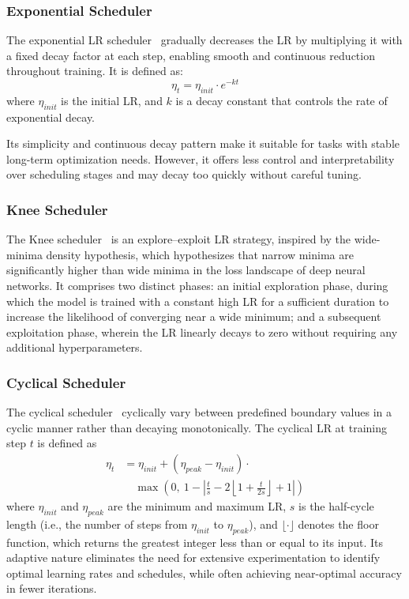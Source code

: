 \subsubsection{Exponential Scheduler}

The exponential LR scheduler~\cite{li2019exponential} gradually decreases the LR by multiplying it with a fixed decay factor at each step, enabling smooth and continuous reduction throughout training. It is defined as:
\[
\eta_t =  \eta_{init} \cdot e^{-kt}
\]
where \(\eta_{init}\) is the initial LR, and \(k\) is a decay constant that controls the rate of exponential decay.

Its simplicity and continuous decay pattern make it suitable for tasks with stable long-term optimization needs. However, it offers less control and interpretability over scheduling stages and may decay too quickly without careful tuning.

\subsubsection{Knee Scheduler}

The Knee scheduler~\cite{iyer2023wide} is an explore–exploit LR strategy, inspired by the wide-minima density hypothesis, which hypothesizes that narrow minima are significantly higher than wide minima in the loss landscape of deep neural networks.  It comprises two distinct phases: an initial exploration phase, during which the model is trained with a constant high LR for a sufficient duration to increase the likelihood of converging near a wide minimum; and a subsequent exploitation phase, wherein the LR linearly decays to zero without requiring any additional hyperparameters.


\subsubsection{Cyclical Scheduler}

The cyclical scheduler~\cite{smith2017cyclical} cyclically vary between predefined boundary values in a cyclic manner rather than decaying monotonically. The cyclical LR at training step \( t \) is defined as
\begin{align}
\eta_t &= \eta_{init} + (\eta_{peak} - \eta_{init}) \cdot \nonumber \\
&\quad \max\left(0,\ 1 - \left| \frac{t}{s} - 2 \left\lfloor 1 + \frac{t}{2s} \right\rfloor + 1 \right| \right)
\end{align}
where \( \eta_{init} \) and \( \eta_{peak} \) are the minimum and maximum LR, \( s \) is the half-cycle length (i.e., the number of steps from \( \eta_{init} \) to \( \eta_{peak} \)), and \( \lfloor \cdot \rfloor \) denotes the floor function, which returns the greatest integer less than or equal to its input. Its adaptive nature eliminates the need for extensive experimentation to identify optimal learning rates and schedules, while often achieving near-optimal accuracy in fewer iterations. 


